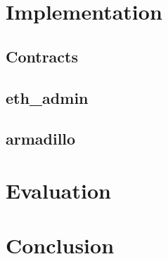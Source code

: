 \documentclass[runningheads]{llncs}
\begin{document}
\section{Implementation}

\subsection{Contracts}

\subsection{eth\_admin}

\subsection{armadillo}

\section{Evaluation}


\section{Conclusion}

%
%
%


\end{document}
